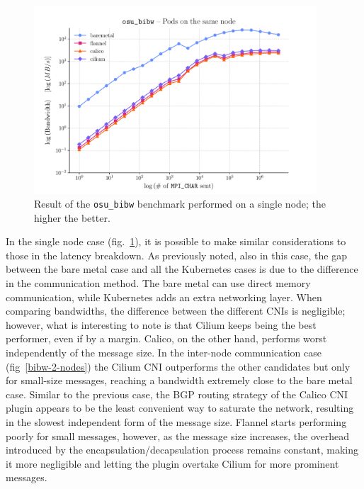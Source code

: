 
\begin{figure}
  \centering
  \includegraphics[width=0.94\textwidth]{img/chpt3/bibw-1-node}
  \caption{Result of the \texttt{osu\_bibw} benchmark performed on a single
    node; the higher the better.}
  \label{fig:bibw-1-node}
\end{figure}

In the single node case (fig.~\ref{fig:bibw-1-node}), it is possible to make
similar considerations to those in the latency breakdown. As previously noted,
also in this case, the gap between the bare metal case and all the Kubernetes
cases is due to the difference in the communication method. The bare metal can
use direct memory communication, while Kubernetes adds an extra networking
layer. When comparing bandwidths, the difference between the different CNIs is
negligible; however, what is interesting to note is that Cilium keeps being the
best performer, even if by a margin. Calico, on the other hand, performs worst
independently of the message size. In the inter-node communication case
(fig~\ref{bibw-2-nodes}) the Cilium CNI outperforms the other candidates but
only for small-size messages, reaching a bandwidth extremely close to the bare
metal case. Similar to the previous case, the BGP routing strategy of the Calico
CNI plugin appears to be the least convenient way to saturate the network,
resulting in the slowest independent form of the message size. Flannel starts
performing poorly for small messages, however, as the message size increases,
the overhead introduced by the encapsulation/decapsulation process remains
constant, making it more negligible and letting the plugin overtake Cilium for
more prominent messages.

